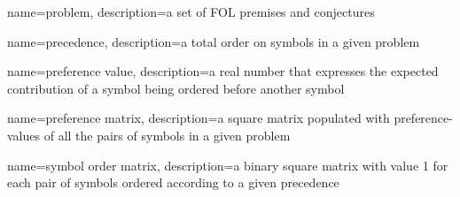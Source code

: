 \usepackage{glossaries}
\makeglossaries


{
	name=problem,
	description={a set of FOL premises and conjectures}
}

{
	name=precedence,
	description={a total order on symbols in a given \gls{problem}}
}

{
	name=preference value,
	description={a real number that expresses the expected contribution of a symbol being ordered before another symbol}
}

{
	name=preference matrix,
	description={a square matrix populated with \glspl{preference-value} of all the pairs of symbols in a given \gls{problem}}
}

{
	name=symbol order matrix,
	description={a binary square matrix with value 1 for each pair of symbols ordered according to a given \gls{precedence}}
}
